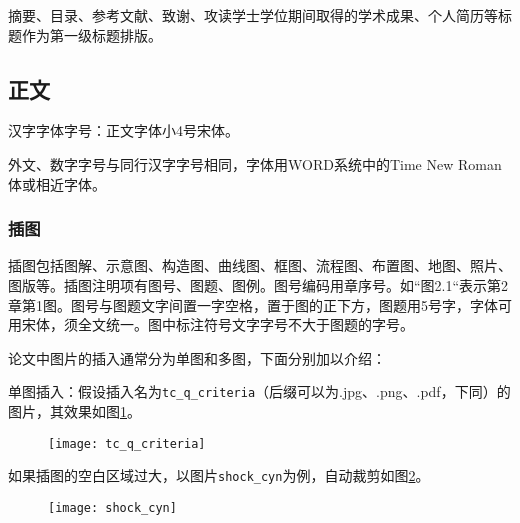 摘要、目录、参考文献、致谢、攻读学士学位期间取得的学术成果、个人简历等标题作为第一级标题排版。

\subsection{正文}
汉字字体字号：正文字体小4号宋体。

外文、数字字号与同行汉字字号相同，字体用WORD系统中的Time New Roman体或相近字体。

\subsubsection{插图}
插图包括图解、示意图、构造图、曲线图、框图、流程图、布置图、地图、照片、图版等。插图注明项有图号、图题、图例。图号编码用章序号。如“图2.1“表示第2章第1图。图号与图题文字间置一字空格，置于图的正下方，图题用5号字，字体可用宋体，须全文统一。图中标注符号文字字号不大于图题的字号。

论文中图片的插入通常分为单图和多图，下面分别加以介绍：

单图插入：假设插入名为\verb|tc_q_criteria|（后缀可以为.jpg、.png、.pdf，下同）的图片，其效果如图\ref{fig:tc_q_criteria}。
\begin{figure}[!htbp]
    \centering
    \texttt{[image: tc\_q\_criteria]}
    \label{fig:tc_q_criteria}
\end{figure}

如果插图的空白区域过大，以图片\verb|shock_cyn|为例，自动裁剪如图\ref{fig:shock_cyn}。
\begin{figure}[!htbp]
    \centering
    \texttt{[image: shock\_cyn]}
    \label{fig:shock_cyn}
\end{figure}

